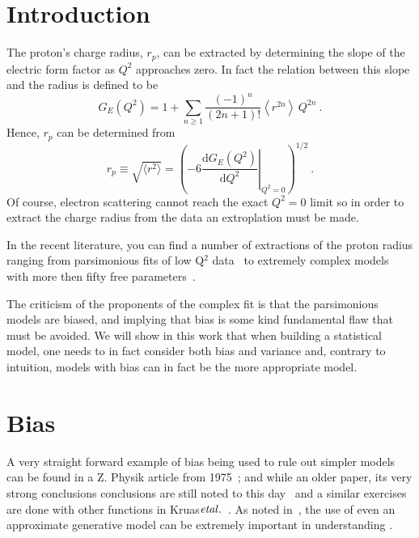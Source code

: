 \documentclass[10pt,aps,prc,twocolumn]{revtex4-1}
\begin{document}
\maketitle

\section{Introduction}

The proton's charge radius, $r_p$, can be extracted
by determining the slope of the electric form factor as $Q^2$
approaches zero.  In fact the relation between this slope and 
the radius is defined to be
$$
G_E(Q^2)
   =  1
   +  \sum_{n\ge 1} \frac{(-1)^n}{(2n+1)!}
      \left\langle r^{2n} \right\rangle \, Q^{2n} \>.
$$
Hence, $r_p$ can be determined from
$$
  r_p \equiv \sqrt{ \langle r^2 \rangle}
   = \left( -6  \left. \frac{\mathrm{d} G_E(Q^2)}{\mathrm{d}Q^2}
    \right|_{Q^{2}=0} \right)^{1/2} \>.
 $$
Of course, electron scattering cannot reach the exact $Q^2 = 0$ limit so 
in order to extract the charge radius from the data an extroplation must
be made.

In the recent literature, you can find a number of extractions of the proton radius ranging from
parsimonious fits of low Q$^2$ data~\cite{Griffioen:2015hta,Horbatsch:2016ilr,Higinbotham:2015rja} to extremely 
complex models with more then fifty free parameters~\cite{}.

The criticism of the proponents of the complex fit is that the parsimonious models are biased, and implying 
that bias is some kind fundamental flaw that must be avoided.    We will show in this work that when building 
a statistical model, one needs to in fact consider both bias and variance and, contrary to intuition, models with 
bias can in fact be the more appropriate model.

\section{Bias}

A very straight forward example of bias being used to rule out simpler models can be found in a Z. Physik
article from 1975~\cite{Borkowski:1975}; and while an older paper, its very strong conclusions conclusions are still 
noted to this day~\cite{Sick:2017aor} and a similar exercises are done with other functions in Kruas$\it{et al.}$~\cite{Kraus:2014qua}.
As noted in~\cite{Hogg:2010yz}, the use of even an approximate generative model can be extremely important in understanding
. 
\end{document}
